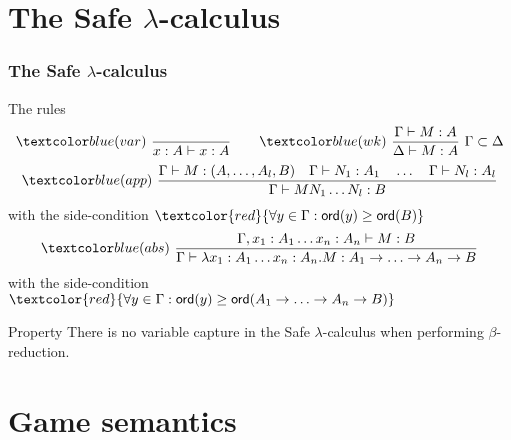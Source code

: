 \section{The Safe \texorpdfstring{$\lambda$}{lambda}-calculus}
\begin{frame} \frametitle{The Safe $\lambda$-calculus}
\begin{block}{The rules}
$$ \rulename{var} \   \rulef{}{x : A\vdash x : A}
\qquad  \rulename{wk} \   \rulef{\Gamma \vdash M : A}{\Delta \vdash M : A} \ \Gamma \subset \Delta$$
$$ \rulename{app} \  \rulef{\Gamma \vdash M : (A,\ldots,A_l,B)
                                        \quad \Gamma \vdash N_1 : A_1
                                        \quad \ldots \quad \Gamma \vdash N_l : A_l  }
                                   {\Gamma  \vdash M N_1 \ldots N_l : B}$$
\hfill with the side-condition $\textcolor{red}{\forall y \in \Gamma : \ord{y} \geq \ord{B}}$
$$ \rulename{abs} \   \rulef{\Gamma, x_1:A_1 \ldots x_n : A_n \vdash M : B}
                                   {\Gamma  \vdash \lambda x_1:A_1 \ldots x_n : A_n . M : A_1 \rightarrow \ldots \rightarrow A_n \rightarrow B}$$
\hfill with the side-condition $\textcolor{red}{\forall y \in \Gamma : \ord{y} \geq \ord{A_1 \rightarrow \ldots \rightarrow A_n \rightarrow B}}$
\end{block} 

\begin{block}{Property} 
There is no variable capture in the Safe $\lambda$-calculus when performing $\beta$-reduction.
\end{block} 
\end{frame}


\section{Game semantics}


\def\highlightat#1#2{\temporal<#1>{#2}{\underline{#2}}{\textcolor{blue}{#2}}}

